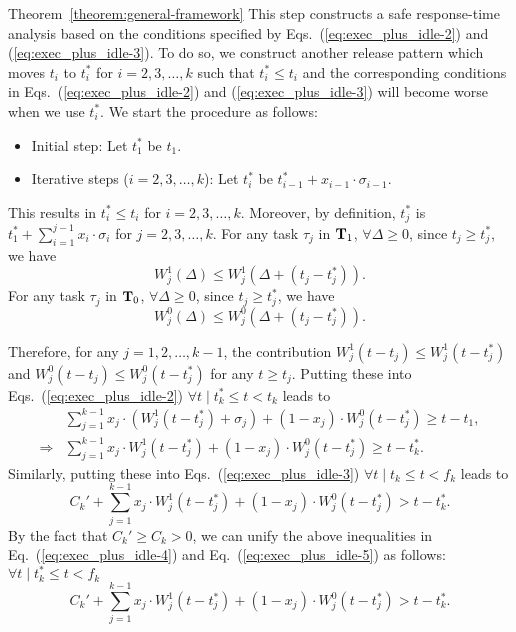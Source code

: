 \begin{appProof}{Theorem~\ref{theorem:general-framework}}
This step constructs a safe response-time analysis based on the
conditions specified by Eqs.~(\ref{eq:exec_plus_idle-2}) and
(\ref{eq:exec_plus_idle-3}). To do so, we construct another release pattern
which moves $t_i$ to $t_i^*$ for $i=2,3,\ldots,k$ such that $t_i^*
\leq t_i$ and the corresponding conditions in Eqs.~(\ref{eq:exec_plus_idle-2}) and
(\ref{eq:exec_plus_idle-3}) will become worse when we use $t_i^*$. We start
the procedure as follows:
\begin{itemize}
\item Initial step: Let $t_1^*$ be $t_1$.
\item Iterative steps ($i=2,3,\ldots,k$): Let $t_i^*$ be $t_{i-1}^*+x_{i-1}\cdot\sigma_{i-1}$.
\end{itemize}
This results in $t_i^* \leq t_i$ for $i=2,3,\ldots,k$. Moreover, by
definition, $t_j^*$ is $t_1^* + \sum_{i=1}^{j-1} x_i\cdot\sigma_i$ for
$j=2,3,\ldots,k$.
For any task $\tau_j$ in ${\bf T}_1$,  $\forall \Delta \geq 0$, since $t_j \geq t_j^*$, we have
\begin{equation}
  \label{eq:execution-case1-shifted}
  W_j^1(\Delta)  \leq W_j^1(\Delta + (t_j-t_j^*)).
\end{equation}
For any task $\tau_j$ in ${\bf T}_0$,  $\forall \Delta \geq 0$, since $t_j \geq t_j^*$, we have
\begin{equation}
  \label{eq:execution-case2-shifted}
  W_j^0(\Delta)  \leq W_j^0(\Delta + (t_j-t_j^*)).
\end{equation}

Therefore, for any $j=1,2,\ldots,k-1$, the contribution $W_j^1(t-t_j)
\leq W_j^1(t-t_j^*)$ and $W_j^0(t-t_j) \leq W_j^0(t-t_j^*)$ for any $t
\geq t_j$. Putting these into 
Eqs.~(\ref{eq:exec_plus_idle-2}) $\forall t \mid t_k^* \leq t < t_k$ leads to
{\small \begin{align}
&\sum_{j=1}^{k-1} x_j\cdot (W_j^1(t-t_j^*)+\sigma_j) + (1-x_j)\cdot W_j^0(t-t_j^*) \geq t-t_1,\nonumber\\
\Rightarrow& \sum_{j=1}^{k-1} x_j\cdot W_j^1(t-t_j^*) + (1-x_j)\cdot W_j^0(t-t_j^*) \geq t-t_k^*.
\label{eq:exec_plus_idle-4}
\end{align}}
Similarly, putting these into 
Eqs.~(\ref{eq:exec_plus_idle-3}) $\forall t \mid t_k \leq t < f_k$ leads to 
\begin{equation}
\label{eq:exec_plus_idle-5}
C_k'+\sum_{j=1}^{k-1} x_j\cdot W_j^1(t-t_j^*) + (1-x_j)\cdot W_j^0(t-t_j^*) > t-t_k^*.
\end{equation}
 By the fact that $C_k' \geq C_k > 0$, we can unify the above inequalities in Eq.~(\ref{eq:exec_plus_idle-4}) and Eq.~(\ref{eq:exec_plus_idle-5}) as follows:
$\forall t \mid t_k^* \leq t < f_k$
\begin{equation}
\label{eq:exec_plus_idle-almost-final} 
C_k'+\sum_{j=1}^{k-1} x_j\cdot W_j^1(t-t_j^*) + (1-x_j)\cdot W_j^0(t-t_j^*) > t-t_k^*.
\end{equation}




\end{appProof}
